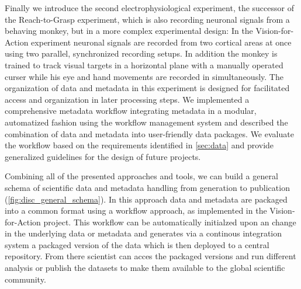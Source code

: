 Finally we introduce the second electrophysiological experiment, the successor of the Reach-to-Grasp experiment, which is also recording neuronal signals from a behaving monkey, but in a more complex experimental design: In the Vision-for-Action experiment neuronal signals are recorded from two cortical areas at once using two parallel, synchronized recording setups. In addition the monkey is trained to track visual targets in a horizontal plane with a manually operated curser while his eye and hand movements are recorded in simultaneously. The organization of data and metadata in this experiment is designed for facilitated access and organization in later processing steps. We implemented a comprehensive metadata workflow integrating metadata in a modular, automatized fashion using the  workflow management system and described the combination of data and metadata into user-friendly data packages. We evaluate the workflow based on the requirements identified in \cref{sec:data} and provide generalized guidelines for the design of future projects.

Combining all of the presented approaches and tools, we can build a general schema of scientific data and metadata handling from generation to publication (\cref{fig:disc_general_schema}). In this approach data and metadata are packaged into a common format using a workflow approach, as implemented in the Vision-for-Action project. This workflow can be automatically initialzed upon an change in the underlying data or metadata and generates via a continous integration system a packaged version of the data which is then deployed to a central repository. From there scientist can acces the packaged versions and run different analysis or publish the datasets to make them available to the global scientific community.

